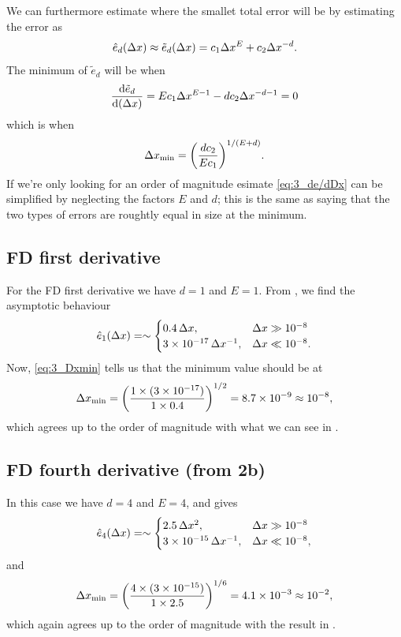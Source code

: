 \documentclass[11pt,letter, swedish, english
]{article}
\begin{document}
We can furthermore estimate where the smallet total error will be by
estimating the error as
\begin{equation}
\hat{e}_d(\Delta{x})\approx\tilde{e}_d(\Delta{x})=c_1\Delta{x}^E + c_2\Delta{x}^{-d}.
\end{equation}
The minimum of $\tilde{e}_d$ will be when
\begin{equation}\label{eq:3_de/dDx}
\dv{\tilde{e}_d}{(\ensuremath{\Delta{x}})}=Ec_1\Delta{x}^{E-1}-dc_2\Delta{x}^{-d-1}=0
\end{equation}
which is when
\begin{equation}\label{eq:3_Dxmin}
\Delta{x}_\text{min}=\qty(\frac{dc_2}{Ec_1})^{1/(E+d)}.
\end{equation}
If we're only looking for an order of magnitude esimate
\eqref{eq:3_de/dDx} can be simplified by neglecting the factors $E$
and $d$; this is the same as saying that the two types of errors are
roughtly equal in size at the minimum.

\subsection{FD first derivative}
For the FD first derivative we have $d=1$ and $E=1$.
From , we find the asymptotic behaviour
\begin{equation}
\hat{e}_1(\Dx)=
\sim\begin{cases}
0.4\,\Dx \qcomma& \Dx\gg 10^{-8}\\
3\times10^{-17}\,\Dx^{-1},& \Dx\ll 10^{-8}.
\end{cases}
\end{equation}
Now, \eqref{eq:3_Dxmin} tells us that the minimum value should be at 
\begin{equation}
\Delta{x}_\text{min}=\qty(\frac{1\times(3\times10^{-17})}{1\times0.4})^{1/2}
=8.7\times10^{-9}\approx 10^{-8},
\end{equation}
which agrees up to the order of magnitude with what we can see in
. 


\subsection{FD fourth derivative (from 2b)}
In this case we have $d=4$ and $E=4$, and  gives
\begin{equation}
\hat{e}_4(\Dx)=
\sim\begin{cases}
2.5\,\Dx^2 \qcomma& \Dx\gg 10^{-8}\\
3\times10^{-15}\,\Dx^{-1},& \Dx\ll 10^{-8},
\end{cases}
\end{equation}
and 
\begin{equation}
\Delta{x}_\text{min}=\qty(\frac{4\times(3\times10^{-15})}{1\times2.5})^{1/6}
=4.1\times10^{-3}\approx 10^{-2},
\end{equation}
which again agrees up to the order of magnitude with the result in
.
\end{document}
